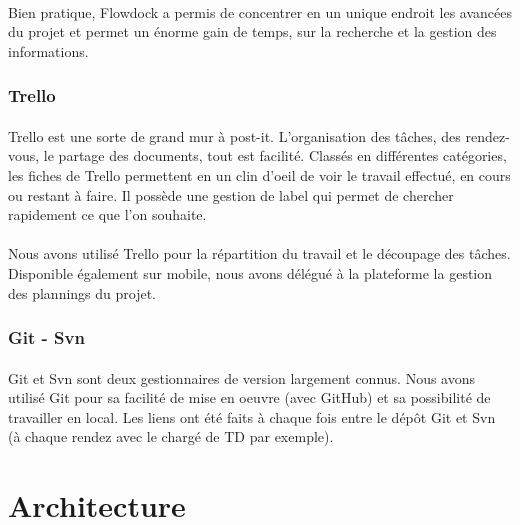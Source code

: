 \documentclass[12pt]{article}
\begin{document}
\paragraph{}Bien pratique, Flowdock a permis de concentrer en un unique endroit les avancées du projet et permet un énorme gain de temps, sur la recherche et la gestion des informations.

\subsubsection{Trello}

\paragraph{}Trello est une sorte de grand mur à post-it. L'organisation des tâches, des rendez-vous, le partage des documents, tout est facilité. Classés en différentes catégories, les fiches de Trello permettent en un clin d'oeil de voir le travail effectué, en cours ou restant à faire. Il possède une gestion de label qui permet de chercher rapidement ce que l'on souhaite.

\paragraph{}Nous avons utilisé Trello pour la répartition du travail et le découpage des tâches. Disponible également sur mobile, nous avons délégué à la plateforme la gestion des plannings du projet.

\subsubsection{Git - Svn}

\paragraph{}Git et Svn sont deux gestionnaires de version largement connus. Nous avons utilisé Git pour sa facilité de mise en oeuvre (avec GitHub) et sa possibilité de travailler en local. Les liens ont été faits à chaque fois entre le dépôt Git et Svn (à chaque rendez avec le chargé de TD par exemple).

\newpage

\section{Architecture}
\end{document}
